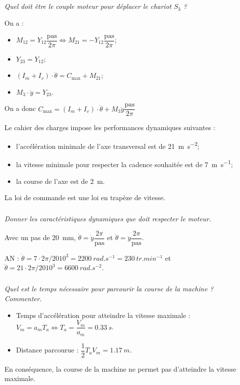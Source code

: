 \documentclass[10pt,fleqn]{article} %
\begin{document}
\begin{multicols}{2}
\begin{multicols}{2}
\subparagraph{}
\textit{Quel doit être le couple moteur pour déplacer le chariot $S_3$ ?}
\ifprof
\begin{corrige}
On a : 
\begin{itemize}
\item $M_{12}=Y_{12}\dfrac{\text{pas}}{2\pi} \Leftrightarrow M_{21}=-Y_{12}\dfrac{\text{pas}}{2\pi}$;
\item $Y_{23}=Y_{12}$;
\item $(I_m+I_v)\cdot \ddot{\theta}=C_{\text{max}}+M_{21}$;
\item $M_3\cdot \ddot{y}=Y_{23}$.
\end{itemize}

On a donc $C_{\text{max}}=(I_m+I_v)\cdot \ddot{\theta}+M_3 \ddot{y}\dfrac{\text{pas}}{2\pi}$
\end{corrige}
\else
\fi

Le cahier des charges impose les performances dynamiques suivantes : 
\begin{itemize}
\item l'accélération minimale de l'axe transversal est de \SI{21}{m.s^{-2}};
\item la vitesse minimale pour respecter la cadence souhaitée est de \SI{7}{m.s^{-1}};
\item la course de l'axe est de \SI{2}{m}.
\end{itemize}

La loi de commande est une loi en trapèze de vitesse. 
\subparagraph{}
\textit{Donner les caractéristiques dynamiques que doit respecter le moteur.}
\ifprof
\begin{corrige}
Avec un pas de \SI{20}{mm}, $\dot{\theta}=\dot{y}\dfrac{2\pi}{\text{pas}}$ et $\ddot{\theta}=\ddot{y}\dfrac{2\pi}{\text{pas}}$. 

AN : $\dot{\theta}=7\cdot 2\pi/20 10^3=\SI{2200}{rad.s^{-1}}=\SI{230}{tr.min^{-1}}$ et $\ddot{\theta}=21\cdot 2\pi/20 10^3 = \SI{6600}{rad.s^{-2}}$.
\end{corrige}
\else
\fi

\subparagraph{}
\textit{Quel est le temps nécessaire pour parcourir la course de la machine ? Commenter.}
\ifprof
\begin{corrige}
\begin{itemize}
\item Temps d'accélération pour atteindre la vitesse maximale : $V_m = a_m T_a \Leftrightarrow T_a = \dfrac{V_m}{a_m}=\SI{0,33}{s}$. 
\item Distance parcourue : $\dfrac{1}{2}T_aV_m = \SI{1,17}{m}$. 
\end{itemize}
En conséquence, la course de la machine ne permet pas d'atteindre la vitesse maximale. 


\end{corrige}
\end{multicols}
\end{multicols}
\end{document}
